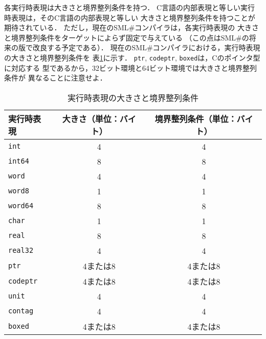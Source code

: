 \documentclass{jbook}
\newcommand{\smlsharp}{SML\#}
\begin{document}
	各実行時表現は大きさと境界整列条件を持つ．
	C言語の内部表現と等しい実行時表現は，そのC言語の内部表現と等しい
大きさと境界整列条件を持つことが期待されている．
	ただし，現在の\smlsharp{}コンパイラは，各実行時表現の
大きさと境界整列条件をターゲットによらず固定で与えている
（この点は\smlsharp{}の将来の版で改良する予定である）．
	現在の\smlsharp{}コンパイラにおける，実行時表現の大きさと境界整列条件を
表\ref{tab:runtimesize}に示す．
	{\tt ptr}, {\tt codeptr}, {\tt boxed}は，Cのポインタ型に対応する
型であるから，32ビット環境と64ビット環境では大きさと境界整列条件が
異なることに注意せよ．
\begin{table}
\begin{center}
\begin{tabular}{|l|c|c|}
\hline
実行時表現 & 大きさ（単位：バイト） & 境界整列条件（単位：バイト）\\ \hline
{\tt int} & 4 & 4 \\
{\tt int64} & 8 & 8 \\
{\tt word} & 4 & 4 \\
{\tt word8} & 1 & 1 \\
{\tt word64} & 8 & 8 \\
{\tt char} & 1 & 1 \\
{\tt real} & 8 & 8 \\
{\tt real32} & 4 & 4 \\
{\tt ptr} & 4または8 & 4または8 \\
{\tt codeptr} & 4または8 & 4または8 \\
{\tt unit} & 4 & 4 \\
{\tt contag} & 4 & 4 \\
{\tt boxed} & 4または8 & 4または8 \\
\hline
\end{tabular}
\end{center}
\caption{実行時表現の大きさと境界整列条件}
\label{tab:runtimesize}
\end{table}
\end{document}
